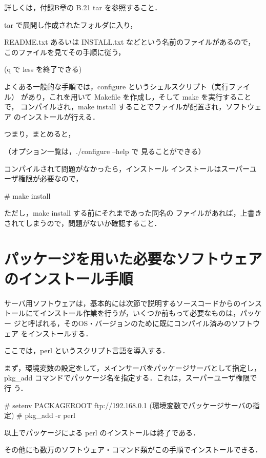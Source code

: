 詳しくは，付録B章の B.21 tar を参照すること．

tar で展開し作成されたフォルダに入り，
\begin{cli}
\end{cli}
README.txt あるいは INSTALL.txt などという名前のファイルがあるので，
このファイルを見てその手順に従う，
\begin{cli}
 (q で less を終了できる)
\end{cli}
よくある一般的な手順では，configure というシェルスクリプト（実行ファイル）
があり，これを用いて Makefile を作成し，そして make を実行することで，
コンパイルされ，make install することでファイルが配置され，ソフトウェア
のインストールが行える．

つまり，まとめると，
\begin{cli}

（オプション一覧は，./configure --help で
  見ることができる）


コンパイルされて問題がなかったら，インストール
インストールはスーパーユーザ権限が必要なので，

# make install

ただし，make install する前にそれまであった同名の
ファイルがあれば，上書きされてしまうので，問題がないか確認すること．
\end{cli}

\section{パッケージを用いた必要なソフトウェアのインストール手順}

サーバ用ソフトウェアは，基本的には次節で説明するソースコードからのインス
トールにてインストール作業を行うが，いくつか前もって必要なものは，パッケー
ジと呼ばれる，そのOS・バージョンのために既にコンパイル済みのソフトウェア
をインストールする．

ここでは，perl というスクリプト言語を導入する．

まず，環境変数の設定をして，メインサーバをパッケージサーバとして指定し，
pkg\_add コマンドでパッケージ名を指定する．これは，スーパーユーザ権限で行
う．

\begin{cli}
# setenv PACKAGEROOT ftp://192.168.0.1
   (環境変数でパッケージサーバの指定)
# pkg_add -r perl
\end{cli}

以上でパッケージによる perl のインストールは終了である．

その他にも数万のソフトウェア・コマンド類がこの手順でインストールできる．
